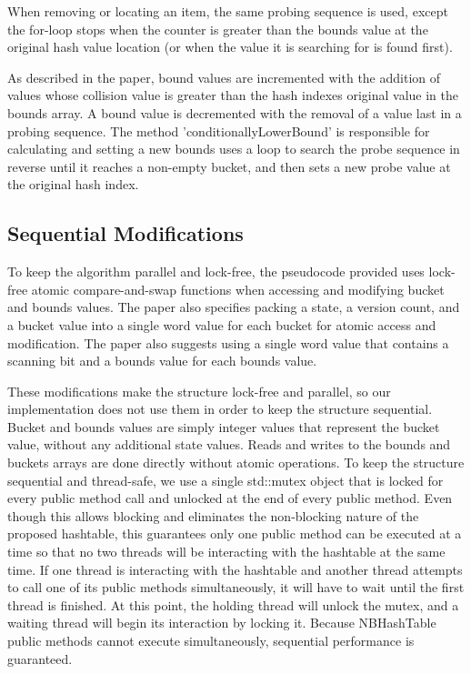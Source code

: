 \documentclass[journal]{IEEEtran}
\begin{document}
When removing or locating an item, the same probing sequence is used, except the for-loop stops when the counter is greater than the bounds value at the original hash value location (or when the value it is searching for is found first).

As described in the paper, bound values are incremented with the addition of values whose collision value is greater than the hash indexes original value in the bounds array. A bound value is decremented with the removal of a value last in a probing sequence. The method ’conditionallyLowerBound’ is responsible for calculating and setting a new bounds uses a loop to search the probe sequence in reverse until it reaches a non-empty bucket, and then sets a new probe value at the original hash index.

\subsection{Sequential Modifications}
To keep the algorithm parallel and lock-free, the pseudocode provided uses lock-free atomic compare-and-swap functions when accessing and modifying bucket and bounds values. The paper also specifies packing a state, a version count, and a bucket value into a single word value for each bucket for atomic access and modification. The paper also suggests using a single word value that contains a scanning bit and a bounds value for each bounds value.

These modifications make the structure lock-free and parallel, so our implementation does not use them in order to keep the structure sequential. Bucket and bounds values are simply integer values that represent the bucket value, without any additional state values. Reads and writes to the bounds and buckets arrays are done directly without atomic operations. To keep the structure sequential and thread-safe, we use a single std::mutex object that is locked for every public method call and unlocked at the end of every public method. Even though this allows blocking and eliminates the non-blocking nature of the proposed hashtable, this guarantees only one public method can be executed at a time so that no two threads will be interacting with the hashtable at the same time. If one thread is interacting with the hashtable and another thread attempts to call one of its public methods simultaneously, it will have to wait until the first thread is finished. At this point, the holding thread will unlock the mutex, and a waiting thread will begin its interaction by locking it. Because NBHashTable public methods cannot execute simultaneously, sequential performance is guaranteed.
\end{document}
